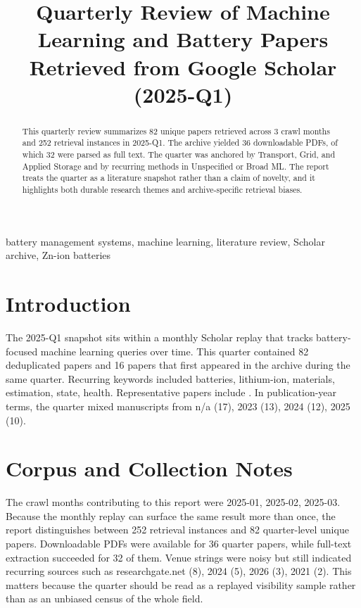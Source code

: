 \documentclass[conference]{IEEEtran}
\begin{document}
\title{ Quarterly Review of Machine Learning and Battery Papers Retrieved from Google Scholar (2025-Q1) }

\author{
}

\maketitle

\begin{abstract}
This quarterly review summarizes 82 unique papers retrieved across 3 crawl months and 252 retrieval instances in 2025-Q1. The archive yielded 36 downloadable PDFs, of which 32 were parsed as full text. The quarter was anchored by Transport, Grid, and Applied Storage and by recurring methods in Unspecified or Broad ML. The report treats the quarter as a literature snapshot rather than a claim of novelty, and it highlights both durable research themes and archive-specific retrieval biases.
\end{abstract}

\begin{IEEEkeywords}
battery management systems, machine learning, literature review, Scholar archive, Zn-ion batteries
\end{IEEEkeywords}

\section{Introduction}
The 2025-Q1 snapshot sits within a monthly Scholar replay that tracks battery-focused machine learning queries over time. This quarter contained 82 deduplicated papers and 16 papers that first appeared in the archive during the same quarter. Recurring keywords included batteries, lithium-ion, materials, estimation, state, health. Representative papers include \cite{stateestimationof2023,textminingfor2022,recentadvancesin2025,section02assessingna}. In publication-year terms, the quarter mixed manuscripts from n/a (17), 2023 (13), 2024 (12), 2025 (10).

\section{Corpus and Collection Notes}
The crawl months contributing to this report were 2025-01, 2025-02, 2025-03. Because the monthly replay can surface the same result more than once, the report distinguishes between 252 retrieval instances and 82 quarter-level unique papers. Downloadable PDFs were available for 36 quarter papers, while full-text extraction succeeded for 32 of them. Venue strings were noisy but still indicated recurring sources such as researchgate.net (8), 2024 (5), 2026 (3), 2021 (2). This matters because the quarter should be read as a replayed visibility sample rather than as an unbiased census of the whole field.
\end{document}
